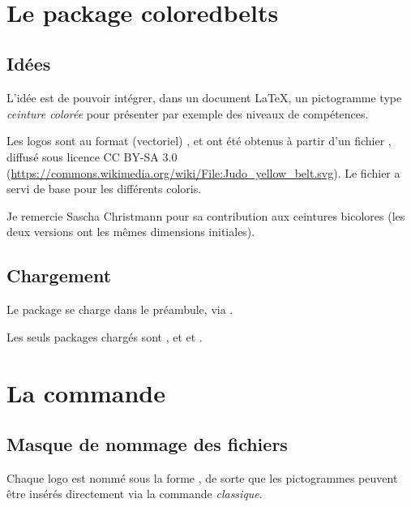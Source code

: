 \documentclass[french,11pt,a4paper]{article}
\begin{document}
\vfill~

\pagebreak

\section{Le package coloredbelts}

\subsection{Idées}

L'idée est de pouvoir intégrer, dans un document \LaTeX, un pictogramme type \textit{ceinture colorée} pour présenter par exemple des niveaux de compétences.

\medskip

Les logos sont au format (vectoriel) , et ont été obtenus à partir d'un fichier , diffusé sous licence CC BY-SA 3.0 (\url{https://commons.wikimedia.org/wiki/File:Judo_yellow_belt.svg}). Le fichier a servi de base pour les différents coloris.

\medskip

Je remercie Sascha Christmann pour sa contribution aux ceintures bicolores (les deux versions ont les mêmes dimensions initiales).

\subsection{Chargement}

Le package se charge dans le préambule, via .

Les seuls packages chargés sont ,  et  et .

\begin{codehigh}[language=latex/latex2,style/main=cyan!10,style/code=cyan!10]
\usepackage{coloredbelts}
\end{codehigh}

\section{La commande}

\subsection{Masque de nommage des fichiers}

Chaque logo est nommé sous la forme , de sorte que les pictogrammes peuvent être insérés directement via la commande  \textit{classique}.
\end{document}

